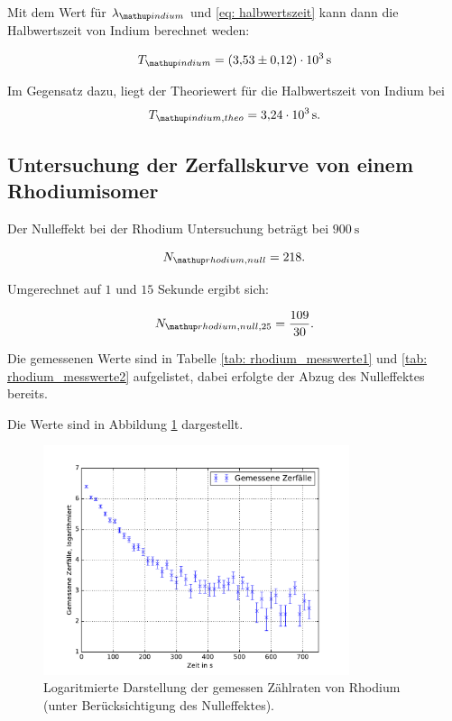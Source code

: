 Mit dem Wert für $\lambda\ua{indium}$ und \eqref{eq: halbwertszeit} kann dann die Halbwertszeit von Indium
berechnet weden:

\begin{equation}
  \label{eq:halbwertzeit_indium}
  T\ua{indium}=\SI{3.53\pm0.12 e+3}{\second}
\end{equation}

Im Gegensatz dazu, liegt der Theoriewert für die Halbwertszeit von Indium\cite{indium_halb} bei
\begin{equation}
  \label{eq:halbwertzeit_indium_theo}
  T\ua{indium,theo}=\SI{3.24 e+3}{\second}.
\end{equation}

\subsection{Untersuchung der Zerfallskurve von einem Rhodiumisomer}

Der Nulleffekt bei der Rhodium Untersuchung beträgt bei $\SI{900}{\second}$

\begin{equation*}
  N\ua{rhodium,null}=218.
\end{equation*}

Umgerechnet auf $1$ und $15$ Sekunde ergibt sich:

\begin{equation*}
     N\ua{rhodium,null,25}=\frac{109}{30}.
\end{equation*}

Die gemessenen Werte sind in Tabelle \ref{tab: rhodium_messwerte1} und \ref{tab: rhodium_messwerte2} aufgelistet, dabei erfolgte
der Abzug des Nulleffektes bereits.


Die Werte sind in Abbildung \ref{fig: plot_rhodium} dargestellt.

\begin{figure}
  \centering
  \includegraphics[width=0.8\textwidth]{pics/ra_all.pdf}
  \caption{Logaritmierte Darstellung der gemessen Zählraten von Rhodium (unter Berücksichtigung des Nulleffektes).}
  \label{fig: plot_rhodium}
\end{figure}




